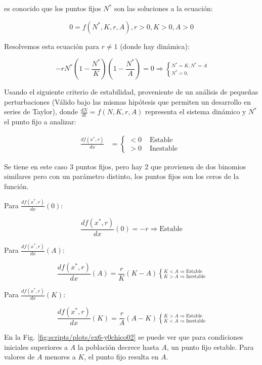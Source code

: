 \documentclass[twocolumn,aps,prl]{revtex4-1}
\newcommand{\Nstar}{N^*}
\begin{document}
es conocido que los puntos fijos $N^*$ son las soluciones a la ecuación:

\begin{equation}\label{eqn:etiqueta3}
    0 = f(N^*, K, r, A), r>0, K>0, A >0
\end{equation}

Resolvemos esta ecuación para $r\neq 1$ (donde hay dinámica):

\begin{equation}\label{eqn:etiqueta3}
    - r \Nstar  (1 - \frac{\Nstar}{K}) (1 - \frac{\Nstar}{A}) = 0 \Rightarrow \left\lbrace ^{\Nstar = K, \Nstar = A} _{\Nstar = 0, }  \right .
\end{equation}

Usando el siguiente criterio de estabilidad, proveniente de un análisis de pequeñas perturbaciones (Válido bajo las mismas hipótesis que permiten un desarrollo en series de Taylor), donde $\frac{dN}{dt} = f(N, K, r, A)$ representa el sistema dinámico y $\Nstar$ el punto fijo a analizar:

$$
\begin{aligned}
    \frac{d f\left(x^{*}, r\right)}{d x} &=\left\{ 
        \begin{array}{ll}
            <0 & \text { Estable } \\
            >0 & \text { Inestable }
        \end{array}\right.
\end{aligned}
$$

Se tiene en este caso 3 puntos fijos, pero hay 2 que provienen de dos binomios similares pero con un parámetro distinto, los puntos fijos son los ceros de la función.

Para $\frac{d f\left(x^{*}, r\right)}{d x} (0):$ 

$$\frac{d f\left(x^{*}, r\right)}{d x} (0) = -r \Rightarrow \text{Estable}$$ 

Para $\frac{d f\left(x^{*}, r\right)}{d x} (A):$ 

$$\frac{d f\left(x^{*}, r\right)}{d x} (A) = \frac{r}{K} (K-A)  
\left\lbrace
^{ K<A \Rightarrow \text{Estable}}
_{ K>A \Rightarrow \text{Inestable}} \right.$$ 

Para $\frac{d f\left(x^{*}, r\right)}{d x} (K):$ 

$$\frac{d f\left(x^{*}, r\right)}{d x} (K) = \frac{r}{A} (A-K) 
\left\lbrace ^{ K>A \Rightarrow \text{Estable}}
_{ K<A \Rightarrow \text{Inestable}} \right. $$ 

En la Fig. \ref{fig:scripts/plots/ex6-y0chico02} se puede ver que para condiciones iniciales superiores a $A$ la población decrece hasta $A$, un punto fijo estable. Para valores de $A$ menores a $K$, el punto fijo resulta en $A$.
\end{document}
